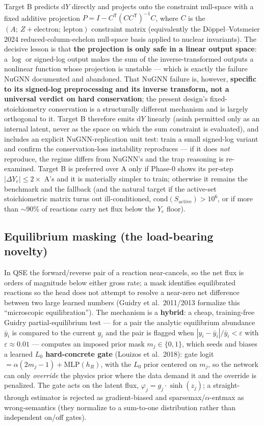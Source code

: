 \documentclass[11pt]{article}
\newcommand{\Ye}{Y_{e}}
\newcommand{\dYe}{\Delta Y_{e}}
\newcommand{\dd}{\mathrm{d}}
\newcommand{\Tr}{^{\mathsf{T}}}
\begin{document}
Target B predicts $\dd Y$ directly and projects onto the constraint null-space with a fixed additive projection $P = I - C\Tr(CC\Tr)^{-1}C$, where $C$ is the $(A;\ Z{+}\text{electron};\ \text{lepton})$ constraint matrix (equivalently the D\"oppel--Votsmeier 2024 reduced-column-echelon null-space basis applied to nuclear invariants). The decisive lesson is that \textbf{the projection is only safe in a linear output space}: a $\log$ or signed-log output makes the sum of the inverse-transformed outputs a nonlinear function whose projection is unstable --- which is exactly the failure NuGNN documented and abandoned. That NuGNN failure is, however, \textbf{specific to its signed-log preprocessing and its inverse transform, not a universal verdict on hard conservation}; the present design's fixed-stoichiometry conservation is a structurally different mechanism and is largely orthogonal to it. Target B therefore emits $\dd Y$ linearly (asinh permitted only as an internal latent, never as the space on which the sum constraint is evaluated), and includes an explicit NuGNN-replication unit test: train a small signed-log variant and confirm the conservation-loss instability reproduces --- if it does \emph{not} reproduce, the regime differs from NuGNN's and the trap reasoning is re-examined. Target B is preferred over A only if Phase-0 shows its per-step $|\dYe| \le 2\times$ A's and it is materially simpler to train; otherwise it remains the benchmark and the fallback (and the natural target if the active-set stoichiometric matrix turns out ill-conditioned, $\mathrm{cond}(S_{\mathrm{active}}) > 10^{6}$, or if more than $\sim$90\% of reactions carry net flux below the $\Ye$ floor).

\subsection{Equilibrium masking (the load-bearing novelty)}

In QSE the forward/reverse pair of a reaction near-cancels, so the net flux is orders of magnitude below either gross rate; a mask identifies equilibrated reactions so the head does not attempt to resolve a near-zero net difference between two large learned numbers (Guidry et al.\ 2011/2013 formalize this ``microscopic equilibration''). The mechanism is a \textbf{hybrid}: a cheap, training-free Guidry partial-equilibrium test --- for a pair the analytic equilibrium abundance $\bar y_i$ is compared to the current $y_i$ and the pair is flagged when $|y_i - \bar y_i|/\bar y_i < \varepsilon$ with $\varepsilon \approx 0.01$ --- computes an imposed prior mask $m_j \in \{0,1\}$, which seeds and biases a learned \textbf{$L_0$ hard-concrete gate} (Louizos et al.\ 2018): gate logit $= \alpha(2m_j - 1) + \mathrm{MLP}(h_R)$, with the $L_0$ prior centered on $m_j$, so the network can only \emph{override} the physics prior where the data demand it and the override is penalized. The gate acts on the latent flux, $\varphi_j = g_j\cdot\sinh(z_j)$; a straight-through estimator is rejected as gradient-biased and sparsemax/$\alpha$-entmax as wrong-semantics (they normalize to a sum-to-one distribution rather than independent on/off gates).
\end{document}
